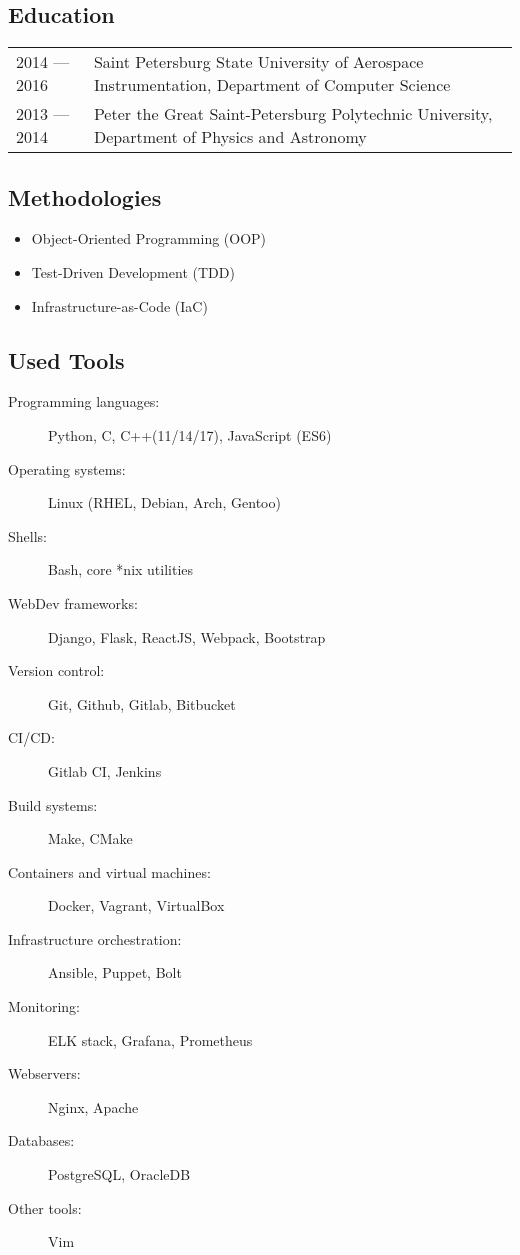 \documentclass[11pt]{report}
\begin{document}
\subsection*{Education}
\begin{table}[H]
    \begin{tabular}{@{}p{}p{}}
        2014 --- 2016 & Saint Petersburg State University of Aerospace Instrumentation, Department of Computer Science \\
        2013 --- 2014 & Peter the Great Saint-Petersburg Polytechnic University, Department of Physics and Astronomy
    \end{tabular}
\end{table}

\subsection*{Methodologies}
\begin{itemize}
    \item Object-Oriented Programming (OOP)
    \item Test-Driven Development (TDD)
    \item Infrastructure-as-Code (IaC)
\end{itemize}

\subsection*{Used Tools}
\begin{description}
    \item[Programming languages:]
    Python, C, C++(11/14/17), JavaScript (ES6)
    \item[Operating systems:]
    Linux (RHEL, Debian, Arch, Gentoo)
    \item[Shells:]
    Bash, core *nix utilities
    \item[WebDev frameworks:]
    Django, Flask, ReactJS, Webpack, Bootstrap
    \item[Version control:]
    Git, Github, Gitlab, Bitbucket
    \item[CI/CD:]
    Gitlab CI, Jenkins
    \item[Build systems:]
    Make, CMake
    \item[Containers and virtual machines:]
    Docker, Vagrant, VirtualBox
    \item[Infrastructure orchestration:]
    Ansible, Puppet, Bolt
    \item[Monitoring:]
    ELK stack, Grafana, Prometheus
    \item[Webservers:]
    Nginx, Apache
    \item[Databases:]
    PostgreSQL, OracleDB
    \item[Other tools:]
    Vim
\end{description}
\end{document}

